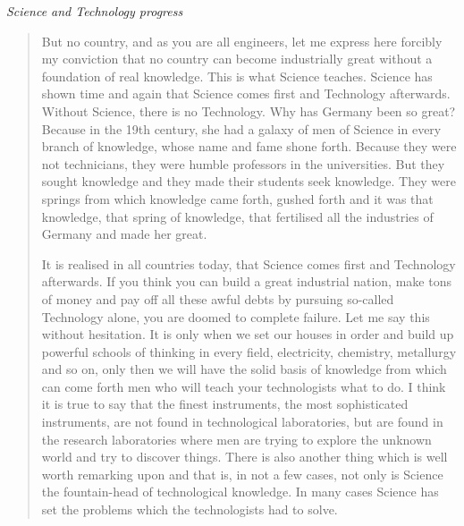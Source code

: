 \noindent
{\em Science and Technology progress}
\begin{quote}
{\fontsize{10pt}{12pt}\selectfont
But no country, and as you are all engineers, let me express here forcibly my conviction that no country can become industrially great without a foundation of real knowledge. This is what Science teaches. Science has shown time and again that Science comes first and Technology afterwards. Without Science, there is no Technology. Why has Germany been so great? Because in the 19th century, she had a galaxy of men of Science in every branch of knowledge, whose name and fame shone forth. Because they were not technicians, they were humble professors in the universities. But they sought knowledge and they made their students seek knowledge. They were springs from which knowledge came forth, gushed forth and it was that knowledge, that spring of knowledge, that fertilised all the industries of Germany and made her great.

It is realised in all countries today, that Science comes first and Technology afterwards. If you think you can build a great industrial nation, make tons of money and pay off all these awful debts by pursuing so-called Technology alone, you are doomed to complete failure. Let me say this without hesitation. It is only when we set our houses in order and build up powerful schools of thinking in every field, electricity, chemistry, metallurgy and so on, only then we will have the solid basis of knowledge from which can come forth men who will teach your technologists what to do. I think it is true to say that the finest instruments, the most sophisticated instruments, are not found in technological laboratories, but are found in the research laboratories where men are trying to explore the unknown world and try to discover things. There is also another thing which is well worth remarking upon and that is, in not a few cases, not only is Science the fountain-head of technological knowledge. In many cases Science has set the problems which the technologists had to solve.

}
\end{quote}
